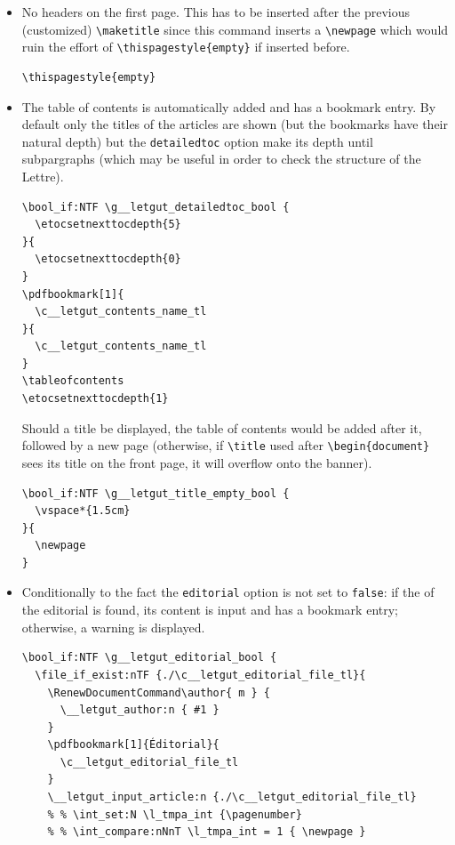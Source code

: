 \documentclass{letgut}
\begin{document}
\begin{itemize}
\item No headers on the first page. This has to be inserted after the previous
(customized) \lstinline+\maketitle+ since this command inserts a \lstinline+\newpage+ which would
ruin the effort of \lstinline+\thispagestyle{empty}+ if inserted before.
\begin{lstlisting}
\thispagestyle{empty}
\end{lstlisting}
\item The table of contents is automatically added and has a bookmark entry. By
default only the titles of the articles are shown (but the bookmarks have
their natural depth) but the \lstinline+detailedtoc+ option make its depth until
subpargraphs (which may be useful in order to check the structure of the
Lettre).
\begin{lstlisting}
\bool_if:NTF \g__letgut_detailedtoc_bool {
  \etocsetnexttocdepth{5}
}{
  \etocsetnexttocdepth{0}
}
\pdfbookmark[1]{
  \c__letgut_contents_name_tl
}{
  \c__letgut_contents_name_tl
}
\tableofcontents
\etocsetnexttocdepth{1}
\end{lstlisting}
Should a title be displayed, the table of contents would be added after it,
followed by a new page (otherwise, if \lstinline+\title+ used after \lstinline+\begin{document}+
sees its title on the front page, it will overflow onto the banner).
\begin{lstlisting}
\bool_if:NTF \g__letgut_title_empty_bool {
  \vspace*{1.5cm}
}{
  \newpage
}
\end{lstlisting}
\item Conditionally to the fact the \lstinline+editorial+ option is not set to \lstinline+false+: if the
 of the editorial is found, its content is input and
has a bookmark entry; otherwise, a warning is displayed.
\begin{lstlisting}
\bool_if:NTF \g__letgut_editorial_bool {
  \file_if_exist:nTF {./\c__letgut_editorial_file_tl}{
    \RenewDocumentCommand\author{ m } {
      \__letgut_author:n { #1 }
    }
    \pdfbookmark[1]{Éditorial}{
      \c__letgut_editorial_file_tl
    }
    \__letgut_input_article:n {./\c__letgut_editorial_file_tl}
    % % \int_set:N \l_tmpa_int {\pagenumber}
    % % \int_compare:nNnT \l_tmpa_int = 1 { \newpage }
\end{lstlisting}
\end{itemize}
\end{document}
